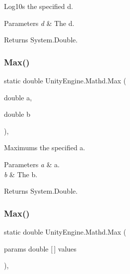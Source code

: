 Log10s the specified d. 


\begin{DoxyParams}{Parameters}
{\em d} & The d.\\
\hline
\end{DoxyParams}
\begin{DoxyReturn}{Returns}
System.\+Double.
\end{DoxyReturn}
\mbox{\label{struct_unity_engine_1_1_mathd_aa86f8014b7dcfd8a07ab6e037de6b98a}} 
\subsubsection{\texorpdfstring{Max()}{Max()}\hspace{0.1cm}{\footnotesize\ttfamily [1/4]}}
{\footnotesize\ttfamily static double Unity\+Engine.\+Mathd.\+Max (\begin{DoxyParamCaption}\item[{double}]{a,  }\item[{double}]{b }\end{DoxyParamCaption})\hspace{0.3cm}{\ttfamily [inline]}, {\ttfamily [static]}}



Maximums the specified a. 


\begin{DoxyParams}{Parameters}
{\em a} & a.\\
\hline
{\em b} & The b.\\
\hline
\end{DoxyParams}
\begin{DoxyReturn}{Returns}
System.\+Double.
\end{DoxyReturn}
\mbox{\label{struct_unity_engine_1_1_mathd_a53c22ef2ad61e4dbf4cdcdb38eb5f325}} 
\subsubsection{\texorpdfstring{Max()}{Max()}\hspace{0.1cm}{\footnotesize\ttfamily [2/4]}}
{\footnotesize\ttfamily static double Unity\+Engine.\+Mathd.\+Max (\begin{DoxyParamCaption}\item[{params double \mbox{[}$\,$\mbox{]}}]{values }\end{DoxyParamCaption})\hspace{0.3cm}{\ttfamily [inline]}, {\ttfamily [static]}}



